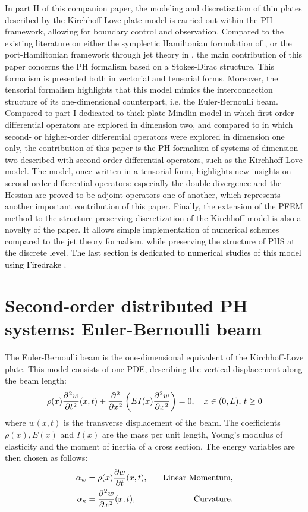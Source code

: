 \documentclass[11pt]{article}
\newcommand{\revOne}[1]{\textcolor{black}{#1}}
\newcommand{\revTwo}[1]{\textcolor{black}{#1}}
\begin{document}
	In part II of this companion paper, the modeling and discretization of thin plates described by the Kirchhoff-Love plate model is carried out within the PH framework, allowing for boundary control and observation. Compared to the existing literature on either the symplectic Hamiltonian formulation of  \cite{LI2016984,LI2018310}, or the port-Hamiltonian framework through jet theory in \revOne{\cite{jetMin,jetKirchh}}, the main contribution of this paper concerns the PH formalism based on a Stokes-Dirac structure. This formalism is presented both in vectorial and tensorial forms.  Moreover, the tensorial formalism \cite[Chapter~16]{Grinfield} highlights that this model mimics the interconnection structure of its one-dimensional counterpart, i.e. the Euler-Bernoulli beam. Compared to part I dedicated to thick plate Mindlin model in which first-order differential operators are explored in dimension two, and compared to \cite{LeGorrec2005} in which second-  or higher-order differential operators were explored in dimension one only, the contribution of this paper is the PH formalism of systems of dimension two described with second-order  differential operators, such as the Kirchhoff-Love  model. The model, once written in a tensorial form, highlights new insights on second-order differential operators: especially the double divergence and the Hessian are proved to be adjoint operators one of another, which represents another important contribution of this paper.
	Finally, the extension of the PFEM method  to the structure-preserving discretization of the Kirchhoff model  is also a novelty of the paper. It allows simple implementation of numerical schemes compared to the jet theory formalism, while preserving the structure of PHS at the discrete level. \revTwo{The last section is dedicated to numerical studies of this model using Firedrake \cite{firedrake}.}
	
	\section{Second-order distributed PH systems: Euler-Bernoulli beam}	
	The Euler-Bernoulli beam is the one-dimensional equivalent of the Kirchhoff-Love plate.  This model consists of one PDE, describing the vertical displacement along the beam length:
	\begin{equation}
	\rho(x) \diffp[2]{w}{t}(x,t) + \displaystyle \diffp[2]{}{x} \left( EI(x) \diffp[2]{w}{x} \right) = 0, \quad x \in (0,L),\, t \ge 0 
	\end{equation}
	where ${w}(x,t)$ is the transverse displacement of the beam. The coefficients $\rho(x), E(x)$ and $I(x)$  are the mass per unit length, Young's modulus of elasticity and the moment of inertia of a cross section. The energy variables are then chosen as follows:
	\begin{equation}
	\begin{aligned}
	\alpha_{w} &= \rho(x) \diffp{w}{t}(x,t),  &\quad \text{Linear Momentum},\\
	\alpha_{\kappa} &= \diffp[2]{w}{x}(x,t), &\quad \text{Curvature}. \\
	\end{aligned}
	\end{equation}
	
\end{document}
